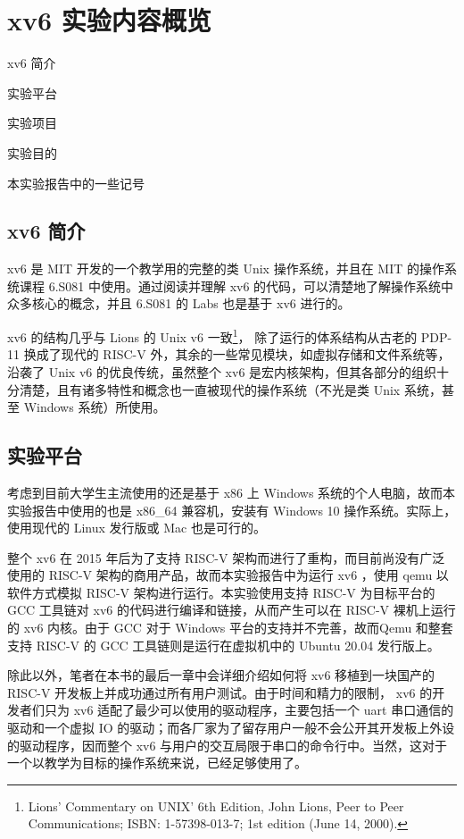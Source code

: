 \chapter{xv6 实验内容概览}
\begin{introduction}
    \item xv6 简介
    \item 实验平台
    \item 实验项目
    \item 实验目的
    \item 本实验报告中的一些记号
\end{introduction}

\section{xv6 简介}

xv6 是 MIT 开发的一个教学用的完整的类 Unix 操作系统，并且在 MIT 的操作系统课程 6.S081 中使用。通过阅读并理解 xv6 的代码，可以清楚地了解操作系统中众多核心的概念，并且 6.S081 的 Labs 也是基于 xv6 进行的。

xv6 的结构几乎与 Lions 的 Unix v6 一致\footnote{Lions' Commentary on UNIX' 6th Edition, John Lions, Peer to Peer Communications; ISBN: 1-57398-013-7; 1st edition (June 14, 2000).}， 除了运行的体系结构从古老的 PDP-11 换成了现代的 RISC-V 外，其余的一些常见模块，如虚拟存储和文件系统等，沿袭了 Unix v6 的优良传统，虽然整个 xv6 是宏内核架构，但其各部分的组织十分清楚，且有诸多特性和概念也一直被现代的操作系统（不光是类 Unix 系统，甚至 Windows 系统）所使用。

\section{实验平台}

考虑到目前大学生主流使用的还是基于 x86 上 Windows 系统的个人电脑，故而本实验报告中使用的也是 x86\_64 兼容机，安装有 Windows 10 操作系统。实际上，使用现代的 Linux 发行版或 Mac 也是可行的。

整个 xv6 在 2015 年后为了支持 RISC-V 架构而进行了重构，而目前尚没有广泛使用的 RISC-V 架构的商用产品，故而本实验报告中为运行 xv6 ，使用 qemu 以软件方式模拟 RISC-V 架构进行运行。本实验使用支持 RISC-V 为目标平台的 GCC 工具链对 xv6 的代码进行编译和链接，从而产生可以在 RISC-V 裸机上运行的 xv6 内核。由于 GCC 对于 Windows 平台的支持并不完善，故而Qemu 和整套支持 RISC-V 的 GCC 工具链则是运行在虚拟机中的 Ubuntu 20.04 发行版上。

除此以外，笔者在本书的最后一章中会详细介绍如何将 xv6 移植到一块国产的 RISC-V 开发板上并成功通过所有用户测试。由于时间和精力的限制， xv6 的开发者们只为 xv6 适配了最少可以使用的驱动程序，主要包括一个 uart 串口通信的驱动和一个虚拟 IO 的驱动；而各厂家为了留存用户一般不会公开其开发板上外设的驱动程序，因而整个 xv6 与用户的交互局限于串口的命令行中。当然，这对于一个以教学为目标的操作系统来说，已经足够使用了。

